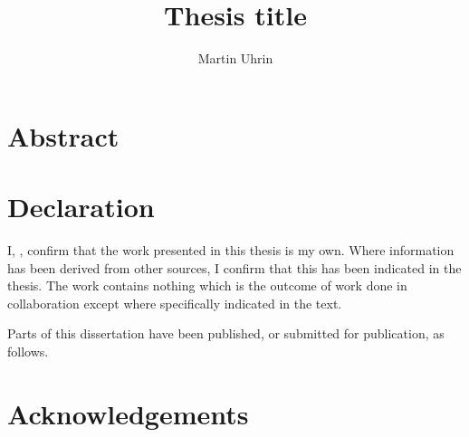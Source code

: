 \documentclass[10pt,twoside]{report}
\title{Thesis title}
\author{Martin Uhrin}
\newif\ifdebugging
\begin{document}


\chapter*{Abstract}

\chapter*{Declaration}


I, \theauthor{}, confirm that the work presented in this thesis is my own. Where information has been derived from other sources, I confirm that this has been indicated in the thesis.  The work contains nothing which is the outcome of work done in collaboration except where specifically indicated in the text.

Parts of this dissertation have been published, or submitted for publication, as follows.

\vfill

\hfill\theauthor

\hfill\monthname{} \the\year

\chapter*{Acknowledgements}

\tableofcontents
\listoffigures
\listoftables

\ifdebugging
  \chapter*{LAYOUT DEBUGGING}
  \layout*{}
\fi


\end{document}
